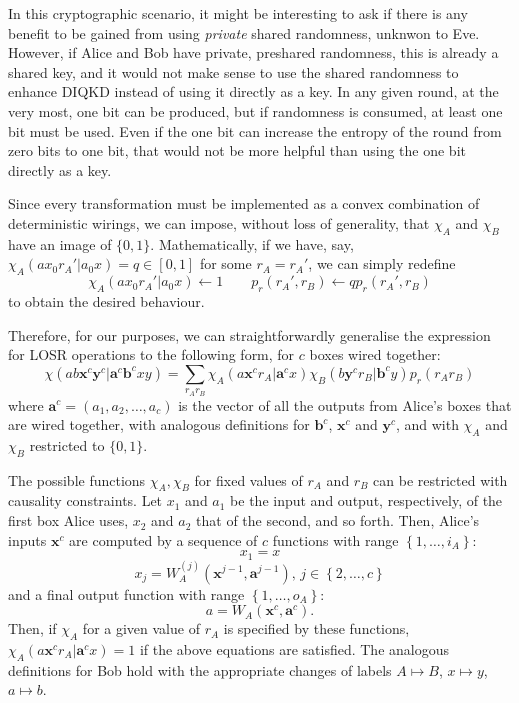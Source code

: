 \documentclass[10pt, a4paper]{article}
\numberwithin{equation}{section} %
\theoremstyle{definition}
\theoremstyle{plain}
\newcommand{\dintv}[2]{\left\{#1,\ldots,#2\right\}}
\newcommand{\ccintv}[2]{\left[#1,#2\right]}
\newcommand{\?}{\mathrel{?}} %
\newcommand{\cvec}[1]{\boldsymbol{\mathbf{#1}}}    %
\begin{document}
      In this cryptographic scenario, it might be interesting to ask if there is any benefit to be gained from using \emph{private} shared randomness, unknwon to Eve. However, if Alice and Bob have private, preshared randomness, this is already a shared key, and it would not make sense to use the shared randomness to enhance DIQKD instead of using it directly as a key. In any given round, at the very most, one bit can be produced, but if randomness is consumed, at least one bit must be used. Even if the one bit can increase the entropy of the round from zero bits to one bit, that would not be more helpful than using the one bit directly as a key.

      Since every transformation must be implemented as a convex combination of deterministic wirings, we can impose, without loss of generality, that \(\chi_A\) and \(\chi_B\) have an image of \(\{0,1\}\). Mathematically, if we have, say, \(\chi_A(ax_0r_A'|a_0x) = q \in \ccintv{0}{1}\) for some \(r_A = r_A'\), we can simply redefine
      \[ \chi_A(ax_0r_A'|a_0x) \gets 1 \qquad p_r(r_A', r_B) \gets qp_r(r_A', r_B) \]
      to obtain the desired behaviour.

      Therefore, for our purposes, we can straightforwardly generalise the expression for LOSR operations to the following form, for \(c\) boxes wired together:
      \begin{equation}\label{eqn:wiringdef}
        \chi(ab\cvec{x}^c\cvec{y}^c|\cvec{a}^c\cvec{b}^cxy) = \sum_{r_A r_B} \chi_A(a\cvec{x}^c r_A|\cvec{a}^cx) \chi_B(b\cvec{y}^c r_B|\cvec{b}^cy) p_r(r_A r_B)
      \end{equation}
      where \(\cvec{a}^c = (a_1, a_2, \ldots, a_c)\) is the vector of all the outputs from Alice's boxes that are wired together, with analogous definitions for \(\cvec{b}^c\), \(\cvec{x}^c\) and \(\cvec{y}^c\), and with \(\chi_A\) and \(\chi_B\) restricted to \(\{0,1\}\).

      The possible functions \(\chi_A, \chi_B\) for fixed values of \(r_A\) and \(r_B\) can be restricted with causality constraints. Let \(x_1\) and \(a_1\) be the input and output, respectively, of the first box Alice uses, \(x_2\) and \(a_2\) that of the second, and so forth. Then, Alice's inputs \(\cvec{x}^c\) are computed by a sequence of \(c\) functions with range \(\dintv{1}{i_A}\):
      \begin{equation} x_1 = x \end{equation}
      \begin{equation} x_j = W^{(j)}_A(\cvec{x}^{j-1}, \cvec{a}^{j-1}),\,j \in \dintv{2}{c} \end{equation}
      and a final output function with range \(\dintv{1}{o_A}\):
      \begin{equation} a = W_A(\cvec{x}^{c}, \cvec{a}^{c}). \end{equation}
      Then, if \(\chi_A\) for a given value of \(r_A\) is specified by these functions, \(\chi_A(a\cvec{x}^c r_A|\cvec{a}^cx) = 1\) if the above equations are satisfied. The analogous definitions for Bob hold with the appropriate changes of labels \(A \mapsto B\), \(x \mapsto y\), \(a \mapsto b\). 
\end{document}
